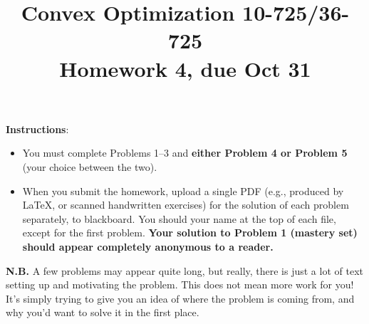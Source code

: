 \documentclass[12pt]{article}
\title{Convex Optimization 10-725/36-725 \\Homework 4, due Oct 31}
\date{}
\begin{document}
\maketitle

{\bf Instructions}: 
\begin{itemize}
\item
You must complete Problems 1--3 and {\bf either
Problem 4 or Problem 5} (your choice between the two). 
\item When you
submit the homework, upload a single PDF (e.g., produced by LaTeX,
or scanned handwritten exercises) for the solution of each problem 
separately, to blackboard. You should your name at the top of each 
file, except for the first problem. {\bf Your solution to Problem 1
(mastery set) should appear completely anonymous to a reader.}
\end{itemize}

\bigskip
{\bf N.B.} A few problems may appear quite long, but really, there
is just a lot of text setting up and motivating the problem. This does not
mean more work for you! It's simply trying to give you an idea of where 
the problem is coming from, and why you'd want to solve it in the first 
place.







\end{document}
